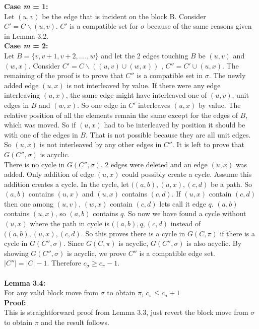 \documentclass[BTech]{iitmdiss}
\begin{document}
\textbf{Case \textit{m} = 1:}\\
Let $(u,v)$ be the edge that is incident on the block B. Consider $C' = C\backslash (u,v)$. $C'$ is a compatible set for $\sigma$ because of the same reasons given in Lemma 3.2.\\
\textbf{Case \textit{m} = 2:}\\
Let $B = \{v,v+1,v+2,....,w\}$ and let the 2 edges touching $B$ be $(u,v)$ and $(w,x)$. Consider $C' = C\backslash ((u,v)\cup(w,x))$ , $C'' = C' \cup (u,x)$. The remaining of the proof is to prove that $C''$ is a compatible set in $\sigma$. The newly added edge $(u,x)$ is not interleaved by value. If there were any edge interleaving $(u,x)$, the same edge might have interleaved one of $(u,v)$, unit edges in $B$ and $(w,x)$. So one edge in $C'$ interleaves $(u,x)$ by value. The relative position of all the elements remain the same except for the edges of $B$, which was moved. So if $(u,x)$ had to be interleaved by position it should be with one of the edges in $B$. That is not possible because they are all unit edges. So $(u,x)$ is not interleaved by any other edges in $C''$. It is left to prove that $G(C'',\sigma)$ is acyclic.\\ There is no cycle in $G(C'',\sigma)$. 2 edges were deleted and an edge $(u,x)$ was added. Only addition of edge $(u,x)$ could possibly create a cycle. Assume this addition creates a cycle. In the cycle, let $((a,b),(u,x),(c,d)$ be a path. So $(a,b)$ contains $(u,x)$ and $(u,x)$ contains $(c,d)$. If $(u,x)$ contain $(c,d)$ then one among $(u,v)$, $(w,x)$ contain $(c,d)$ lets call it edge $q$. $(a,b)$ contains $(u,x)$, so $(a,b)$ contains $q$. So now we have found a cycle without $(u,x)$ where the path in cycle is $((a,b),q,(c,d)$ instead of $((a,b),(u,x),(c,d)$. So this proves there is a cycle in $G(C,\pi)$ if there is a cycle in $G(C'',\sigma)$. Since $G(C,\pi)$ is acyclic, $G(C'',\sigma)$ is also acyclic. By showing $G(C'',\sigma)$ is acyclic, we prove $C''$ is a compatible edge set. $|C''| = |C| - 1$. Therefore $c_\sigma \geq c_\pi - 1$.\\~\\
\noindent
\textbf{Lemma 3.4:}\\
For any valid block move from $\sigma$ to obtain $\pi$, $c_\pi \leq c_\sigma + 1$\\
\textbf{Proof:}\\
This is straightforward proof from Lemma 3.3, just revert the block move from $\sigma$ to obtain $\pi$ and the result follows.\\~\\
\end{document}
